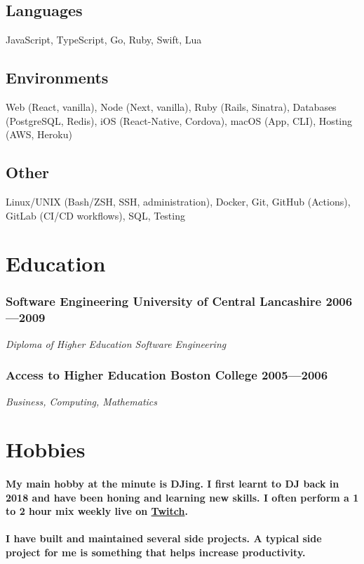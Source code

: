\documentclass[a4paper]{article}
\newcommand{\datedsubsection}[2]{
  \subsubsection{#1 \hfill \textbf{#2}}
}
\begin{document}
\subsection{Languages} JavaScript, TypeScript, Go, Ruby, Swift, Lua

\subsection{Environments} Web (React, vanilla), Node (Next, vanilla), Ruby (Rails, Sinatra), Databases (PostgreSQL, Redis), iOS (React-Native, Cordova), macOS (App, CLI), Hosting (AWS, Heroku)

\subsection{Other} Linux/UNIX (Bash/ZSH, SSH, administration), Docker, Git, GitHub (Actions), GitLab (CI/CD workflows), SQL, Testing

\clearpage

\section{Education}

\datedsubsection{\textbf{Software Engineering} University of Central Lancashire}{2006---2009}
\textit{Diploma of Higher Education Software Engineering}

\datedsubsection{\textbf{Access to Higher Education} Boston College}{2005---2006}
\textit{Business, Computing, Mathematics}

\section{Hobbies}
\paragraph{My main hobby at the minute is DJing. I first learnt to DJ back in 2018 and have been honing and learning new skills. I often perform a 1 to 2 hour mix weekly live on \href{https://twitch.tv/iamdjriff}{Twitch}.}

\paragraph{I have built and maintained several side projects. A typical side project for me is something that helps increase productivity.}
\end{document}
